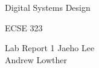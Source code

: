 \documentclass[12pt,letterpaper,titlepage]{article}
\begin{document}
\begin{titlepage}
	\centering
	{\LARGE Digital Systems Design \par}
	{\LARGE ECSE 323 \par}
	\vspace{.5cm}
	{\LARGE Lab Report 1}
	\vfill
	Jaeho Lee \\
	Andrew Lowther \\
\end{titlepage}


\end{document}
